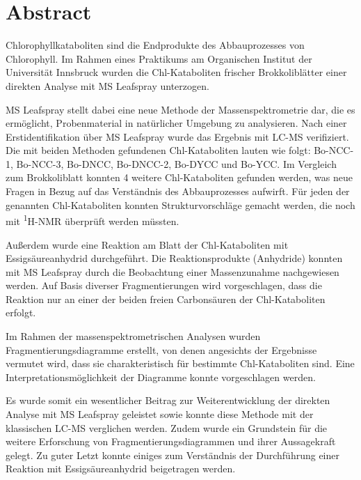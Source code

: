 

\chapter*{Abstract}
\label{cha:abstract}

Chlorophyllkataboliten sind die Endprodukte des Abbauprozesses von Chlorophyll. Im Rahmen eines Praktikums am Organischen Institut der Universität Innsbruck wurden die Chl-Kataboliten frischer Brokkoliblätter einer direkten Analyse mit MS Leafspray unterzogen. 

MS Leafspray stellt dabei eine neue Methode der Massenspektrometrie dar, die es ermöglicht, Probenmaterial in natürlicher Umgebung zu analysieren. Nach einer Erstidentifikation über MS Leafspray wurde das Ergebnis mit LC-MS verifiziert. Die mit beiden Methoden gefundenen Chl-Kataboliten lauten wie folgt: Bo-NCC-1, Bo-NCC-3, Bo-DNCC, Bo-DNCC-2, Bo-DYCC und Bo-YCC. Im Vergleich zum Brokkoliblatt konnten 4 weitere Chl-Kataboliten gefunden werden, was neue Fragen in Bezug auf das Verständnis des Abbauprozesses aufwirft. Für jeden der genannten Chl-Kataboliten konnten Strukturvorschläge gemacht werden, die noch mit \textsuperscript{1}H-NMR überprüft werden müssten.

Außerdem wurde eine Reaktion am Blatt der Chl-Kataboliten mit Essigsäureanhydrid durchgeführt. Die Reaktionsprodukte (Anhydride) konnten mit MS Leafspray durch die Beobachtung einer Massenzunahme nachgewiesen werden. Auf Basis diverser Fragmentierungen wird vorgeschlagen, dass die Reaktion nur an einer der beiden freien Carbonsäuren der Chl-Kataboliten erfolgt. 

Im Rahmen der massenspektrometrischen Analysen wurden Fragmentierungsdiagramme erstellt, von denen angesichts der Ergebnisse vermutet wird, dass sie charakteristisch für bestimmte Chl-Kataboliten sind. Eine Interpretationsmöglichkeit der Diagramme konnte vorgeschlagen werden. 

Es wurde somit ein wesentlicher Beitrag zur Weiterentwicklung der direkten Analyse mit MS Leafspray geleistet sowie konnte diese Methode mit der klassischen LC-MS verglichen werden. Zudem wurde ein Grundstein für die weitere Erforschung von Fragmentierungsdiagrammen und ihrer Aussagekraft gelegt. Zu guter Letzt konnte einiges zum Verständnis der Durchführung einer Reaktion mit Essigsäureanhydrid beigetragen werden.



